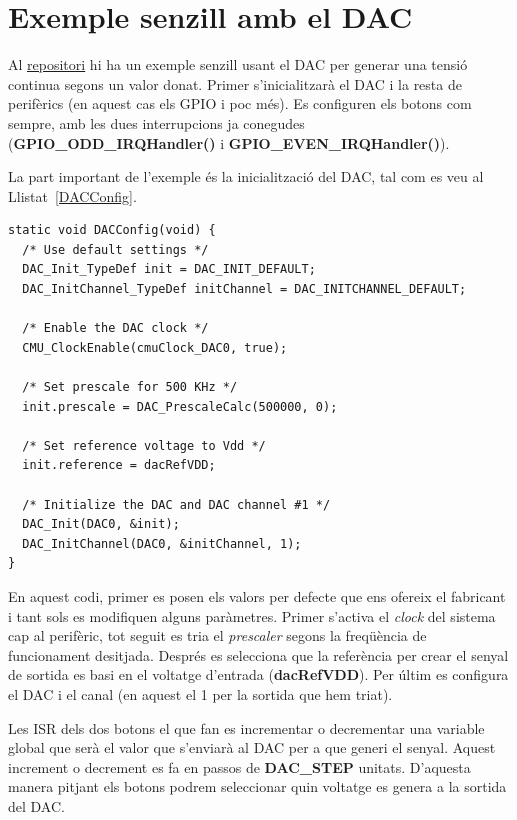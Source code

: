 \section{Exemple senzill amb el DAC}
\label{sec:DAC_Example_1}

Al \href{https://github.com/mariusmm/cursembedded/tree/master/Simplicity/DAC_1}{repositori} hi ha un exemple senzill usant el DAC per generar una tensió continua segons un valor donat.
Primer s'inicialitzarà el \gls{DAC} i la resta de perifèrics (en aquest cas els GPIO i poc més). Es configuren els botons com sempre, amb les dues interrupcions ja conegudes ({\bf GPIO\_ODD\_IRQHandler()} i {\bf GPIO\_EVEN\_IRQHandler()}).

La part important de l'exemple és la inicialització del DAC, tal com es veu al Llistat~\ref{DACConfig}.

\begin{lstlisting}[style=customc, caption=Inicialització del DAC, label=DACConfig]
static void DACConfig(void) {
  /* Use default settings */
  DAC_Init_TypeDef init = DAC_INIT_DEFAULT;
  DAC_InitChannel_TypeDef initChannel = DAC_INITCHANNEL_DEFAULT;

  /* Enable the DAC clock */
  CMU_ClockEnable(cmuClock_DAC0, true);

  /* Set prescale for 500 KHz */
  init.prescale = DAC_PrescaleCalc(500000, 0);

  /* Set reference voltage to Vdd */
  init.reference = dacRefVDD;

  /* Initialize the DAC and DAC channel #1 */
  DAC_Init(DAC0, &init);
  DAC_InitChannel(DAC0, &initChannel, 1);
}
\end{lstlisting}

En aquest codi, primer es posen els valors per defecte que ens ofereix el fabricant i tant sols es modifiquen alguns paràmetres. Primer s'activa el {\em clock} del sistema cap al perifèric, tot seguit es tria el {\em prescaler} segons la freqüència de funcionament desitjada.  Després es selecciona que la referència per crear el senyal de sortida es basi en el voltatge d'entrada ({\bf dacRefVDD}). Per últim es configura el DAC i el canal (en aquest el 1 per la sortida que hem triat).

Les \gls{ISR} dels dos botons el que fan es incrementar o decrementar una variable global que serà el valor que s'enviarà al DAC per a que generi el senyal. Aquest increment o decrement es fa en passos de {\bf DAC\_STEP} unitats. D'aquesta manera pitjant els botons podrem seleccionar quin voltatge es genera a la sortida del DAC.


